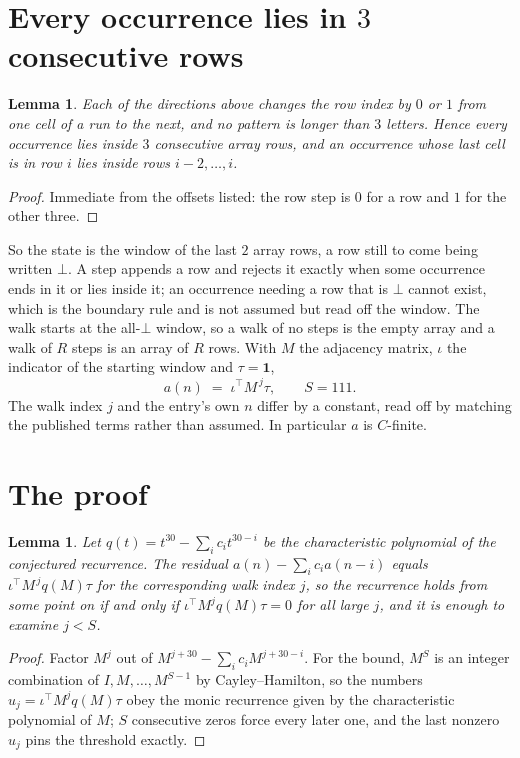 \documentclass[11pt,a4paper]{article}
\theoremstyle{plain}
\newtheorem{lemma}[theorem]{Lemma}
\theoremstyle{definition}
\begin{document}
\section{Every occurrence lies in $3$ consecutive rows}

\begin{lemma}\label{lem:win}
Each of the directions above changes the row index by $0$ or $1$ from one cell of a run to the
next, and no pattern is longer than $3$ letters. Hence every occurrence lies inside $3$
consecutive array rows, and an occurrence whose last cell is in row $i$ lies inside rows
$i-2,\dots,i$.
\end{lemma}

\begin{proof}
Immediate from the offsets listed: the row step is $0$ for a row and $1$ for the other three.
\end{proof}

So the state is the window of the last $2$ array rows, a row still to come being written
$\bot$. A step appends a row and rejects it exactly when some occurrence ends in it or lies
inside it; an occurrence needing a row that is $\bot$ cannot exist, which is the boundary rule
and is not assumed but read off the window. The walk starts at the all-$\bot$ window, so a walk
of no steps is the empty array and a walk of $R$ steps is an array of $R$ rows. With $M$ the
adjacency matrix, $\iota$ the indicator of the starting window and $\tau=\mathbf{1}$,
\[
a(n)\;=\;\iota^{\!\top}M^{\,j}\tau ,\qquad S=111.
\]
The walk index $j$ and the entry's own $n$ differ by a constant, read off by matching the
published terms rather than assumed. In particular $a$ is $C$-finite.

\section{The proof}

\begin{lemma}\label{lem:crit}
Let $q(t)=t^{30}-\sum_i c_it^{30-i}$ be the characteristic polynomial of the
conjectured recurrence. The residual $a(n)-\sum_ic_ia(n-i)$ equals
$\iota^{\!\top}M^{\,j}q(M)\tau$ for the corresponding walk index $j$, so the recurrence
holds from some point on if and only if $\iota^{\!\top}M^{j}q(M)\tau=0$ for all large $j$,
and it is enough to examine $j<S$.
\end{lemma}

\begin{proof}
Factor $M^{j}$ out of $M^{j+30}-\sum_ic_iM^{j+30-i}$. For the bound, $M^{S}$
is an integer combination of $I,M,\dots,M^{S-1}$ by Cayley--Hamilton, so the numbers
$u_j=\iota^{\!\top}M^{j}q(M)\tau$ obey the monic recurrence given by the characteristic
polynomial of $M$; $S$ consecutive zeros force every later one, and the last nonzero $u_j$
pins the threshold exactly.
\end{proof}
\end{document}
